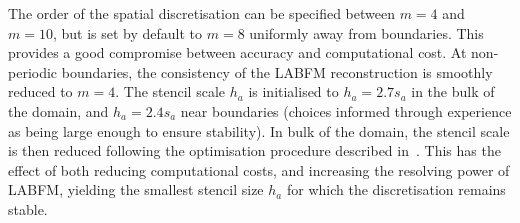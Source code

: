 \documentclass[notitlepage]{revtex4-1}
\begin{document}
The order of the spatial discretisation can be specified between $m=4$ and $m=10$, but is set by default to $m=8$ uniformly away from boundaries. This provides a good compromise between accuracy and computational cost. At non-periodic boundaries, the consistency of the LABFM reconstruction is smoothly reduced to $m=4$. The stencil scale $h_{a}$ is initialised to $h_{a}=2.7s_{a}$ in the bulk of the domain, and $h_{a}=2.4s_{a}$ near boundaries (choices informed through experience as being large enough to ensure stability). In bulk of the domain, the stencil scale is then reduced following the optimisation procedure described in~\cite{king_2022}. This has the effect of both reducing computational costs, and increasing the resolving power of LABFM, yielding the smallest stencil size $h_{a}$ for which the discretisation remains stable.
\end{document}
